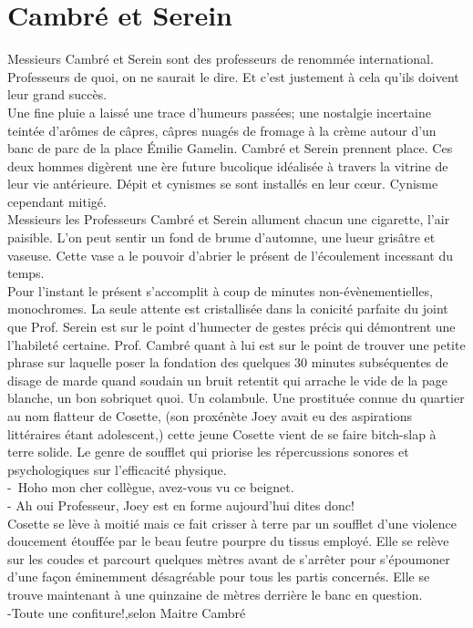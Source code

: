 \section*{Cambré et Serein}

\setlength{\parindent}{0cm}
Messieurs Cambré et Serein sont des professeurs de renommée
international. Professeurs de quoi, on ne saurait le dire. Et c’est
justement à cela qu’ils doivent leur grand succès.\\

Une fine pluie a laissé une trace d'humeurs passées; une nostalgie
incertaine teintée d'arômes de câpres, câpres nuagés de fromage à la
crème autour d’un banc de parc de la place Émilie Gamelin. Cambré et
Serein prennent place. Ces deux hommes digèrent une ère future
bucolique idéalisée à travers la vitrine de leur vie antérieure. Dépit
et cynismes se sont installés en leur cœur. Cynisme cependant mitigé.\\

Messieurs les Professeurs Cambré et Serein allument chacun une
cigarette, l’air paisible. L’on peut sentir un fond de brume
d’automne, une lueur grisâtre et vaseuse. Cette vase a le pouvoir
d’abrier le présent de l’écoulement incessant du temps. \\

Pour l’instant le présent s’accomplit à coup de minutes
non-évènementielles, monochromes. La seule attente est cristallisée
dans la conicité parfaite du joint que
Prof. Serein est sur le point d’humecter de gestes précis qui
démontrent une l’habileté certaine. Prof. Cambré quant à lui est sur
le point de trouver une petite phrase sur laquelle poser la fondation
des quelques 30 minutes subséquentes de disage de marde quand soudain
un bruit retentit qui arrache le vide de la page blanche, un bon
sobriquet quoi. Un colambule.  Une prostituée connue du quartier au
nom flatteur de Cosette, (son proxénète Joey avait eu des aspirations
littéraires étant adolescent,) cette jeune Cosette vient de se faire
bitch-slap  à terre solide. Le genre de soufflet qui priorise les
répercussions sonores et psychologiques sur l’efficacité physique.\\

- Hoho mon cher collègue, avez-vous vu ce beignet. \\
- Ah oui Professeur, Joey est en forme aujourd’hui dites donc!\\

Cosette se lève à moitié mais ce fait crisser à terre par un soufflet
d'une violence doucement étouffée par le beau feutre pourpre du tissus
employé. Elle se relève sur les coudes et parcourt quelques mètres
avant de s'arrêter pour s'époumoner d'une façon éminemment désagréable
pour tous les partis concernés. Elle se trouve maintenant à une
quinzaine de mètres derrière le banc en question.\\
-Toute une confiture!,selon Maitre Cambré

